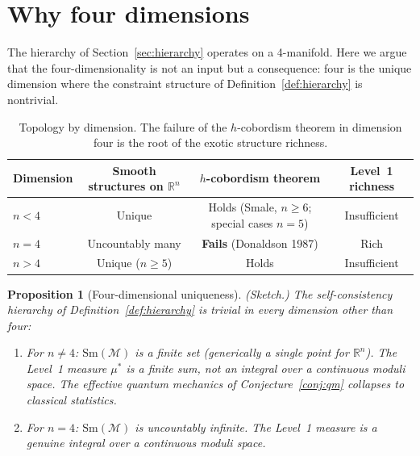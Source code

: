\documentclass[12pt,a4paper]{article}
\newtheorem{proposition}{Proposition}
\theoremstyle{definition}
\theoremstyle{remark}
\begin{document}
\section{Why four dimensions}
\label{sec:dimensions}

The hierarchy of Section~\ref{sec:hierarchy} operates on a 4-manifold.
Here we argue that the four-dimensionality is not an input but a
consequence: four is the unique dimension where the constraint structure
of Definition~\ref{def:hierarchy} is nontrivial.

\begin{table}[h]
\centering
\begin{tabular}{lccc}
\toprule
Dimension & Smooth structures on $\mathbb{R}^n$ & $h$-cobordism theorem & Level~1 richness \\
\midrule
$n < 4$ & Unique & Holds (Smale, $n \geq 6$; special cases $n = 5$) & Insufficient \\
$n = 4$ & Uncountably many & \textbf{Fails} (Donaldson 1987) & Rich \\
$n > 4$ & Unique ($n \geq 5$) & Holds & Insufficient \\
\bottomrule
\end{tabular}
\caption{Topology by dimension. The failure of the $h$-cobordism theorem in
dimension four is the root of the exotic structure richness.}
\label{tab:dimensions}
\end{table}

\begin{proposition}[Four-dimensional uniqueness]
\emph{(Sketch.)}
\label{prop:4d}
The self-consistency hierarchy of Definition~\ref{def:hierarchy} is trivial
in every dimension other than four:
\begin{enumerate}
\item For $n \neq 4$: $\mathrm{Sm}(\mathcal{M})$ is a finite set
(generically a single point for $\mathbb{R}^n$). The Level~1 measure
$\mu^*$ is a finite sum, not an integral over a continuous moduli space.
The effective quantum mechanics of Conjecture~\ref{conj:qm} collapses to
classical statistics.

\item For $n = 4$: $\mathrm{Sm}(\mathcal{M})$ is uncountably infinite.
The Level~1 measure is a genuine integral over a continuous moduli space.
\end{enumerate}
\end{proposition}
\end{document}
